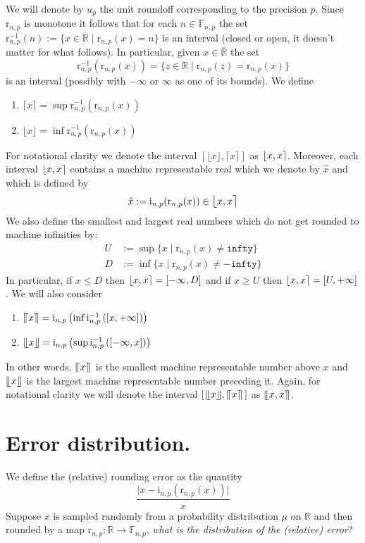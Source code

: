 \documentclass[10pt,a4paper]{article}
\theoremstyle{plain}
\theoremstyle{definition}
\newcommand{\F}[1][n,p]{\mathbb{F}_{#1}}
\newcommand{\R}{\mathbb{R}}
\newcommand{\eR}{\overline{\R}}
\newcommand{\Rep}[1][n,p]{\mathrm{i}_{#1}}
\newcommand{\Round}[1][n,p]{\mathrm{r}_{#1}}
\newcommand{\ceil}[1]{\lceil #1 \rceil}
\newcommand{\floor}[1]{\lfloor #1 \rfloor}
\newcommand{\cceil}[1]{\llceil #1 \rrceil}
\newcommand{\ffloor}[1]{\llfloor #1 \rrfloor}
\newcommand{\inv}{^{-1}}
\newcommand{\fintvl}[1][x]{\mathlarger{\lfloor}#1,#1\mathlarger{\rceil}}
\newcommand{\ffintvl}[1][x]{\mathlarger{\llfloor}#1,#1\mathlarger{\rrceil}}
\newcommand{\absv}[1]{\vert #1\vert}
\newcommand{\uro}[1][p]{u_{#1}}
\begin{document}
We will denote by $\uro$ the unit roundoff corresponding to the precision $p$. Since $\Round$ is monotone it follows that for each $n\in\F$ the set $\Round\inv(n):=\{x\in\eR\mid \Round(x)=n\}$ is an interval (closed or open, it doesn't matter for what follows). In particular, given $x\in \eR$ the set
\[
\Round\inv(\Round(x))=\{z\in\R\mid \Round(z)=\Round(x)\}
\]
is an interval (possibly with $-\infty$ or $\infty$ as one of its bounds). We define
\begin{enumerate}
\item $\ceil{x}=\sup \Round\inv(\Round(x))$
\item $\floor{x}=\inf \Round\inv(\Round(x))$
\end{enumerate}
For notational clarity we denote the interval $\left[\floor{x},\ceil{x}\right]$ as $\fintvl$.
Moreover, each interval $\fintvl$ contains a machine representable real which we denote by $\hat{x}$ and which is defined by
\[
\hat{x}:=\Rep(\Round(x))\in \fintvl
\]
We also define the smallest and largest real numbers which do not get rounded to machine infinities by:
\begin{align*}
U&:=\sup\{x\mid \Round(x)\neq\mathtt{infty}\}\\
D&:=\inf\{x\mid \Round(x)\neq-\mathtt{infty}\}
\end{align*}
In particular, if $x\leq D$ then $\fintvl=\left[-\infty,D\right]$ and if $x\geq U$ then $\fintvl=\left[U,+\infty\right]$.
We will also consider 
\begin{enumerate}
\item $\cceil{x}= \Rep\left(\inf \Rep\inv\left(\left[x,+\infty\right]\right)\right) $
\item $\ffloor{x}=\Rep\left(\sup \Rep\inv\left(\left[-\infty,x\right]\right)\right)$
\end{enumerate}
In other words, $\cceil{x}$ is the smallest machine representable number above $x$ and $\ffloor{x}$ is the largest machine representable number preceding it. Again, for notational clarity we will denote the interval  $\left[\hspace{1pt}\ffloor{x},\cceil{x}\hspace{2pt}\right]$ as $\ffintvl$.




\section{Error distribution.}

We define the (relative) rounding error as the quantity
\[
\frac{\absv{x-\Rep(\Round(x))}}{x}
\]
Suppose $x$ is sampled randomly from a probability distribution $\mu$ on $\R$ and then rounded by a map $\Round:\R\to\F$, \emph{what is the distribution of the (relative) error}?
\end{document}
